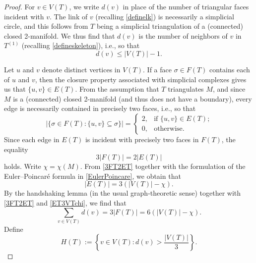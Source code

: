 \documentclass[12pt]{article}
\begin{document}
\begin{proof}
 For $v \in V(T)$, we write $d(v)$ in place of the number of triangular faces incident with $v$. The link of $v$ (recalling \eqref{definelk}) is 
 necessarily a simplicial circle, and this follows from $T$ being a simplicial triangulation of a (connected) 
 closed 2-manifold. We thus find that $d(v)$ is 
 the number of neighbors of $v$ in $T^{(1)}$ (recalling \eqref{defineskeleton}), 
 i.e., so that 
\begin{equation}\label{crudedv} 
 d(v) \leq \left| V(T) \right| - 1. 
\end{equation} 

 Let $u$ and $v$ denote distinct vertices in $V(T)$. 
 If a face $\sigma \in F(T)$ contains each of $u$ and $v$, 
 then the closure property associated with simplicial complexes gives us that 
 $\{ u, v \} \in E(T)$. From the assumption that $T$ triangulates $M$, and since $M$ is a (connected) closed 2-manifold (and thus does 
 not have a boundary), 
 every edge is necessarily contained in precisely two faces, i.e., so that
 \begin{equation*}
 \left| \{ \sigma \in F(T) : \{ u, v \} \subseteq \sigma \} \right| = \begin{cases} 
 2, & \text{if $\{ u, v \} \in E(T)$;} \\ 
 0, & \text{otherwise. } 
 \end{cases} 
\end{equation*}
 Since each edge in $E(T)$ is incident with precisely two faces in $F(T)$, 
 the equality 
\begin{equation}\label{3FT2ET} 
 3 |F(T)| = 2 |E(T)| 
\end{equation}
 holds. Write $\chi = \chi(M)$. From \eqref{3FT2ET} together with the 
 formulation of the Euler--Poincar\'{e} formula in \eqref{EulerPoincare}, 
 we obtain that 
\begin{equation}\label{ET3VTchi} 
 \left| E(T) \right| = 3 \left( \left| V(T) \right| - \chi \right). 
\end{equation}
 By the handshaking lemma (in the usual graph-theoretic sense) 
 together with \eqref{3FT2ET} and \eqref{ET3VTchi}, we find that 
\begin{equation}\label{fromhandshake} 
 \sum_{v \in V(T)} d(v) = 3 \left| F(T) \right| = 6 \left( \left| V(T) \right| - \chi \right). 
\end{equation}
 Define 
\begin{equation}\label{defineHT} 
 H(T) := \left\{ v \in V(T) : d(v) > \frac{ \left| V(T) \right| }{3} \right\}. 

\end{equation}
\end{proof}
\end{document}
